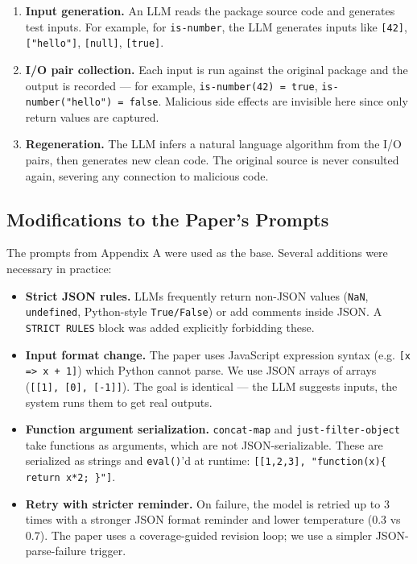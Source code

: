 \documentclass[11pt,a4paper]{article}
\begin{document}
\begin{enumerate}[leftmargin=*]
  \item \textbf{Input generation.} An LLM reads the package source code and
  generates test inputs. For example, for \texttt{is-number}, the LLM generates
  inputs like \texttt{[42]}, \texttt{["hello"]}, \texttt{[null]}, \texttt{[true]}.

  \item \textbf{I/O pair collection.} Each input is run against the original
  package and the output is recorded — for example,
  \texttt{is-number(42) = true}, \texttt{is-number("hello") = false}. Malicious
  side effects are invisible here since only return values are captured.

  \item \textbf{Regeneration.} The LLM infers a natural language algorithm
  from the I/O pairs, then generates new clean code. The original source is
  never consulted again, severing any connection to malicious code.
\end{enumerate}

\subsection{Modifications to the Paper's Prompts}

The prompts from Appendix A were used as the base. Several additions were
necessary in practice:

\begin{itemize}[leftmargin=*]
  \item \textbf{Strict JSON rules.} LLMs frequently return non-JSON values
  (\texttt{NaN}, \texttt{undefined}, Python-style \texttt{True/False}) or add
  comments inside JSON. A \texttt{STRICT RULES} block was added explicitly
  forbidding these.

  \item \textbf{Input format change.} The paper uses JavaScript expression
  syntax (e.g. \texttt{[x => x + 1]}) which Python cannot parse. We use JSON
  arrays of arrays (\texttt{[[1], [0], [-1]]}). The goal is identical — the
  LLM suggests inputs, the system runs them to get real outputs.

  \item \textbf{Function argument serialization.} \texttt{concat-map} and
  \texttt{just-filter-object} take functions as arguments, which are not
  JSON-serializable. These are serialized as strings and \texttt{eval()}'d at
  runtime: \texttt{[[1,2,3], "function(x)\{ return x*2; \}"]}.

  \item \textbf{Retry with stricter reminder.} On failure, the model is retried
  up to 3 times with a stronger JSON format reminder and lower temperature
  (0.3 vs 0.7). The paper uses a coverage-guided revision loop; we use a
  simpler JSON-parse-failure trigger.
\end{itemize}
\end{document}
